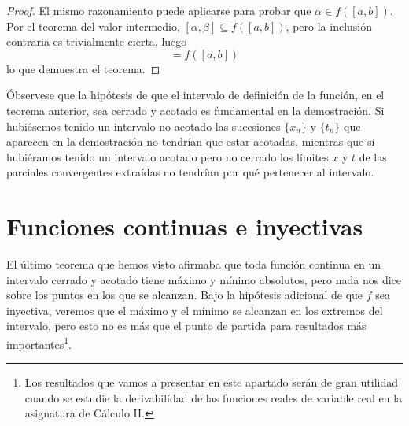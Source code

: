 \begin{proof}
    El mismo razonamiento puede aplicarse para probar que $\alpha \in f([a,b])$. Por el teorema del valor intermedio, $[\alpha, \beta] \subseteq f([a,b])$, pero la inclusión contraria es trivialmente cierta, luego
    \begin{equation*}
        [\alpha, \beta] = f([a,b])
    \end{equation*}
    lo que demuestra el teorema.
\end{proof}

Óbservese que la hipótesis de que el intervalo de definición de la función, en el teorema anterior, sea cerrado y acotado es fundamental en la demostración. Si hubiésemos tenido un intervalo no acotado las sucesiones $\{x_n\}$ y $\{t_n\}$ que aparecen en la demostración no tendrían que estar acotadas, mientras que si hubiéramos tenido un intervalo acotado pero no cerrado los límites $x$ y $t$ de las parciales convergentes extraídas no tendrían por qué pertenecer al intervalo.


\section{Funciones continuas e inyectivas}

El último teorema que hemos visto afirmaba que toda función continua en un intervalo cerrado y acotado tiene máximo y mínimo absolutos, pero nada nos dice sobre los puntos en los que se alcanzan. Bajo la hipótesis adicional de que $f$ sea inyectiva, veremos que el máximo y el mínimo se alcanzan en los extremos del intervalo, pero esto no es más que el punto de partida para resultados más importantes\footnote{Los resultados que vamos a presentar en este apartado serán de gran utilidad cuando se estudie la derivabilidad de las funciones reales
de variable real en la asignatura de Cálculo II.}.

